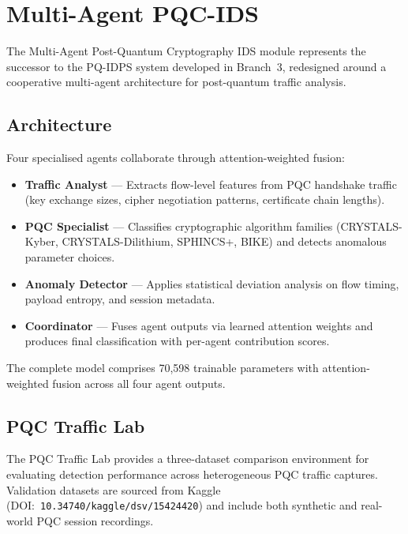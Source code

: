 \section{Multi-Agent PQC-IDS}
\label{sec:pqc_ids}

The Multi-Agent Post-Quantum Cryptography IDS module represents the
successor to the PQ-IDPS system developed in Branch~3, redesigned around
a cooperative multi-agent architecture for post-quantum traffic analysis.

\subsection{Architecture}
Four specialised agents collaborate through attention-weighted fusion:
\begin{itemize}
  \item \textbf{Traffic Analyst} --- Extracts flow-level features from
        PQC handshake traffic (key exchange sizes, cipher negotiation
        patterns, certificate chain lengths).
  \item \textbf{PQC Specialist} --- Classifies cryptographic algorithm
        families (CRYSTALS-Kyber, CRYSTALS-Dilithium, SPHINCS+, BIKE)
        and detects anomalous parameter choices.
  \item \textbf{Anomaly Detector} --- Applies statistical deviation
        analysis on flow timing, payload entropy, and session metadata.
  \item \textbf{Coordinator} --- Fuses agent outputs via learned
        attention weights and produces final classification with
        per-agent contribution scores.
\end{itemize}

The complete model comprises 70,598 trainable parameters with
attention-weighted fusion across all four agent outputs.

\subsection{PQC Traffic Lab}
The PQC Traffic Lab provides a three-dataset comparison environment
for evaluating detection performance across heterogeneous PQC traffic
captures.  Validation datasets are sourced from Kaggle
(DOI:~\texttt{10.34740/kaggle/dsv/15424420}) and include both synthetic
and real-world PQC session recordings.

